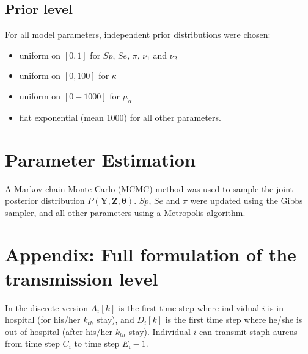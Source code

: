 \documentclass[10pt]{article}
\begin{document}





\subsection*{Prior level}


For all model parameters, independent prior distributions were chosen: 
\begin{itemize}
	\item uniform on $[0,1]$ for $Sp$, $Se$, $\pi$, $\nu_1$ and $\nu_2$
	\item uniform on $[0,100]$ for $\kappa$ 
	\item uniform on $[0-1000]$ for $\mu_{\alpha}$
	\item flat exponential (mean 1000) for all other parameters. 
\end{itemize}

  
\section*{Parameter Estimation}

A Markov chain Monte Carlo (MCMC) method was used to sample the joint
posterior distribution $P\left(\bm{Y},\bm{Z},\bm{\theta}\right)$.
$Sp$, $Se$ and $\pi$ were updated using the Gibbs sampler, and all other parameters using a Metropolis algorithm.


\section*{Appendix: Full formulation of the transmission level}

In the discrete version $A_i[k]$ is the first time step where individual $i$ is in hospital (for his/her $k_{th}$ stay), and $D_i[k]$ is the first time step where he/she is out of hospital (after his/her $k_{th}$ stay). Individual $i$ can transmit staph aureus from time step $C_i$ to time step $E_i-1$. 
\end{document}

